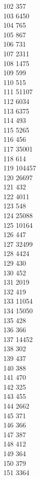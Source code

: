 { 102	357 \\
 103	6450 \\
 104	765 \\
 105	867 \\
 106	731 \\
 107	2311 \\
 108	1475 \\
 109	599 \\
 110	515 \\
 111	51107 \\
 112	6034 \\
 113	6375 \\
 114	493 \\
 115	5265 \\
 116	456 \\
 117	35001 \\
 118	614 \\
 119	104457 \\
 120	26697 \\
 121	432 \\
 122	4011 \\
 123	548 \\
 124	25088 \\
 125	10164 \\
 126	447 \\
 127	32499 \\
 128	4424 \\
 129	430 \\
 130	452 \\
 131	2019 \\
 132	419 \\
 133	11054 \\
 134	15050 \\
 135	428 \\
 136	366 \\
 137	14452 \\
 138	302 \\
 139	437 \\
 140	388 \\
 141	470 \\
 142	325 \\
 143	455 \\
 144	2662 \\
 145	371 \\
 146	366 \\
 147	387 \\
 148	412 \\
 149	364 \\
 150	379 \\
 151	3364 \\
}
